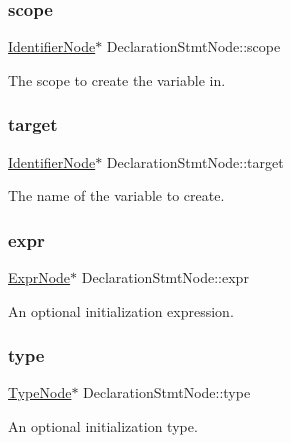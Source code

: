 \subsubsection{\texorpdfstring{scope}{scope}}
{\footnotesize\ttfamily \hyperlink{parser_8h_a930727769b8a8eb0d24d474f3aa12a43}{Identifier\+Node}$\ast$ Declaration\+Stmt\+Node\+::scope}

The scope to create the variable in. \mbox{\label{struct_declaration_stmt_node_a6fed156d07803ffd41487e873bcef98f}} 
\subsubsection{\texorpdfstring{target}{target}}
{\footnotesize\ttfamily \hyperlink{parser_8h_a930727769b8a8eb0d24d474f3aa12a43}{Identifier\+Node}$\ast$ Declaration\+Stmt\+Node\+::target}

The name of the variable to create. \mbox{\label{struct_declaration_stmt_node_aba3f89fdd66c4b0264490aa639a6bd6f}} 
\subsubsection{\texorpdfstring{expr}{expr}}
{\footnotesize\ttfamily \hyperlink{struct_expr_node}{Expr\+Node}$\ast$ Declaration\+Stmt\+Node\+::expr}

An optional initialization expression. \mbox{\label{struct_declaration_stmt_node_ac3e465107333db72e1f87a6cc0f41a68}} 
\subsubsection{\texorpdfstring{type}{type}}
{\footnotesize\ttfamily \hyperlink{struct_type_node}{Type\+Node}$\ast$ Declaration\+Stmt\+Node\+::type}

An optional initialization type. \mbox{\label{struct_declaration_stmt_node_aae96000b3961b3d34a1eac8034ae16bc}} 
